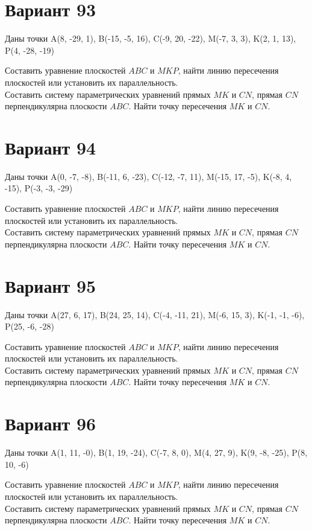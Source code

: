 \documentclass[11pt]{article}
\begin{document}
\section*{Вариант 93}
Даны точки A(8, -29, 1), B(-15, -5, 16), C(-9, 20, -22), M(-7, 3, 3), K(2, 1, 13), P(4, -28, -19)

Составить уравнение плоскостей $ABC$ и $MKP$, найти линию пересечения плоскостей или установить их параллельность.\\
Составить систему параметрических уравнений прямых $MK$ и $CN$, прямая $CN$ перпендикулярна плоскости $ABC$. Найти точку пересечения $MK$ и $CN$.

\section*{Вариант 94}
Даны точки A(0, -7, -8), B(-11, 6, -23), C(-12, -7, 11), M(-15, 17, -5), K(-8, 4, -15), P(-3, -3, -29)

Составить уравнение плоскостей $ABC$ и $MKP$, найти линию пересечения плоскостей или установить их параллельность.\\
Составить систему параметрических уравнений прямых $MK$ и $CN$, прямая $CN$ перпендикулярна плоскости $ABC$. Найти точку пересечения $MK$ и $CN$.

\section*{Вариант 95}
Даны точки A(27, 6, 17), B(24, 25, 14), C(-4, -11, 21), M(-6, 15, 3), K(-1, -1, -6), P(25, -6, -28)

Составить уравнение плоскостей $ABC$ и $MKP$, найти линию пересечения плоскостей или установить их параллельность.\\
Составить систему параметрических уравнений прямых $MK$ и $CN$, прямая $CN$ перпендикулярна плоскости $ABC$. Найти точку пересечения $MK$ и $CN$.

\section*{Вариант 96}
Даны точки A(1, 11, -0), B(1, 19, -24), C(-7, 8, 0), M(4, 27, 9), K(9, -8, -25), P(8, 10, -6)

Составить уравнение плоскостей $ABC$ и $MKP$, найти линию пересечения плоскостей или установить их параллельность.\\
Составить систему параметрических уравнений прямых $MK$ и $CN$, прямая $CN$ перпендикулярна плоскости $ABC$. Найти точку пересечения $MK$ и $CN$.
\end{document}
